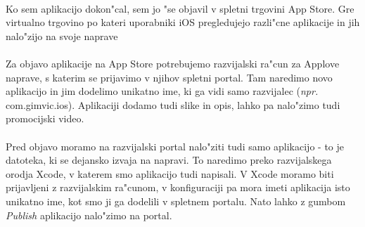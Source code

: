 \paragraph{}Ko sem aplikacijo dokon"cal, sem jo "se objavil v spletni trgovini App Store. Gre virtualno trgovino po kateri uporabniki iOS pregledujejo razli"cne aplikacije in jih nalo"zijo na svoje naprave 

\paragraph{}Za objavo aplikacije na App Store potrebujemo razvijalski ra"cun za Applove naprave, s katerim se prijavimo v njihov spletni portal. Tam naredimo novo aplikacijo in jim dodelimo unikatno ime, ki ga vidi samo razvijalec (\textit{npr.} com.gimvic.ios). Aplikaciji dodamo tudi slike in opis, lahko pa nalo"zimo tudi promocijski video.

\paragraph{}Pred objavo moramo na razvijalski portal nalo"ziti tudi samo aplikacijo - to je datoteka, ki se dejansko izvaja na napravi. To naredimo preko razvijalskega orodja Xcode, v katerem smo aplikacijo tudi napisali. V Xcode moramo biti prijavljeni z razvijalskim ra"cunom, v konfiguraciji pa mora imeti aplikacija isto unikatno ime, kot smo ji ga dodelili v spletnem portalu. Nato lahko z gumbom \textit{Publish} aplikacijo nalo"zimo na portal.